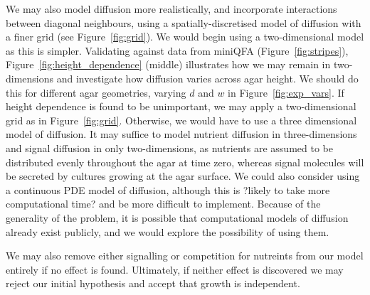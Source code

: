 We may also model diffusion more realistically, and incorporate
interactions between diagonal neighbours, using a
spatially-discretised model of diffusion with a finer grid (see
Figure~\ref{fig:grid}). We would begin using a two-dimensional model as
this is simpler. Validating against data from miniQFA
(Figure~\ref{fig:stripes}), Figure~\ref{fig:height_dependence}
(middle) illustrates how we may remain in two-dimensions and
investigate how diffusion varies across agar height. We should do this
for different agar geometries, varying \(d\) and \(w\) in
Figure~\ref{fig:exp_vars}. If height dependence is found to be
unimportant, we may apply a two-dimensional grid as in
Figure~\ref{fig:grid}. Otherwise, we would have to use a three
dimensional model of diffusion. It may suffice to model nutrient
diffusion in three-dimensions and signal diffusion in only
two-dimensions, as nutrients are assumed to be distributed evenly
throughout the agar at time zero, whereas signal molecules will be
secreted by cultures growing at the agar surface. We could also
consider using a continuous PDE model of diffusion, although this is
?likely to take more computational time? and be more difficult to
implement. Because of the generality of the problem, it is
possible that computational models of diffusion already exist
publicly, and we would explore the possibility of using them.

We may also remove either signalling or competition for nutreints from
our model entirely if no effect is found. Ultimately, if neither effect
is discovered we may reject our initial hypothesis and accept that
growth is independent.

